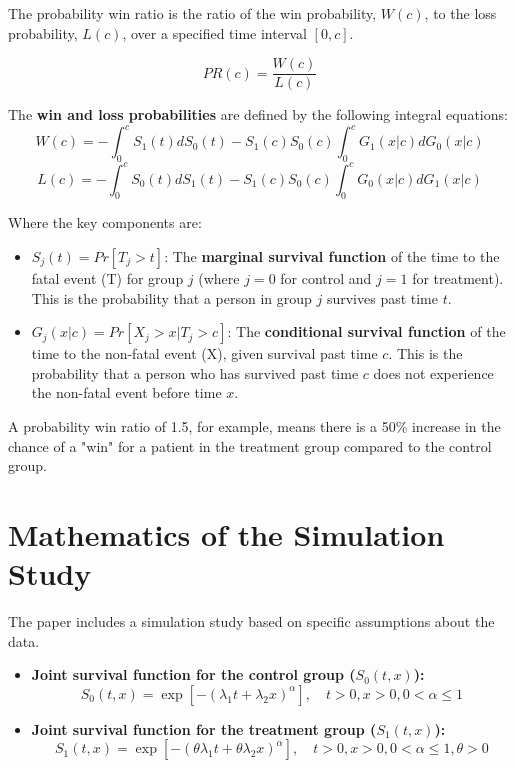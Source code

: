 \documentclass{article}
\begin{document}
The probability win ratio is the ratio of the win probability, $W(c)$, to the loss probability, $L(c)$, over a specified time interval $[0, c]$.

\begin{equation}
PR(c) = \frac{W(c)}{L(c)}
\end{equation}

The \textbf{win and loss probabilities} are defined by the following integral equations:
\begin{equation}
W(c) = -\int_{0}^{c}S_{1}(t)dS_{0}(t)-S_{1}(c)S_{0}(c)\int_{0}^{c}G_{1}(x|c)dG_{0}(x|c)
\end{equation}
\begin{equation}
L(c) = -\int_{0}^{c}S_{0}(t)dS_{1}(t)-S_{1}(c)S_{0}(c)\int_{0}^{c}G_{0}(x|c)dG_{1}(x|c)
\end{equation}

Where the key components are:
\begin{itemize}
    \item $S_j(t) = Pr[T_j > t]$: The \textbf{marginal survival function} of the time to the fatal event (T) for group $j$ (where $j=0$ for control and $j=1$ for treatment). This is the probability that a person in group $j$ survives past time $t$.
    \item $G_j(x|c) = Pr[X_j > x | T_j > c]$: The \textbf{conditional survival function} of the time to the non-fatal event (X), given survival past time $c$. This is the probability that a person who has survived past time $c$ does not experience the non-fatal event before time $x$.
\end{itemize}

A probability win ratio of 1.5, for example, means there is a 50\% increase in the chance of a "win" for a patient in the treatment group compared to the control group.

\section{Mathematics of the Simulation Study}

The paper includes a simulation study based on specific assumptions about the data.

\begin{itemize}
    \item \textbf{Joint survival function for the control group ($S_0(t,x)$):}
    \begin{equation}
    S_0(t,x) = \exp[-(\lambda_1 t + \lambda_2 x)^\alpha], \quad t>0, x>0, 0 < \alpha \le 1
    \end{equation}

    \item \textbf{Joint survival function for the treatment group ($S_1(t,x)$):}
    \begin{equation}
    S_1(t,x) = \exp[-(\theta \lambda_1 t + \theta \lambda_2 x)^\alpha], \quad t>0, x>0, 0 < \alpha \le 1, \theta > 0
    \end{equation}
\end{itemize}
\end{document}
